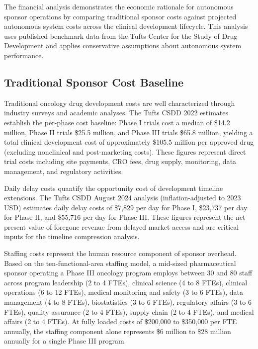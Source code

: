 
The financial analysis demonstrates the economic rationale for autonomous sponsor operations
by comparing traditional sponsor costs against projected autonomous system costs across the
clinical development lifecycle. This analysis uses published benchmark data from the Tufts
Center for the Study of Drug Development and applies conservative assumptions about
autonomous system performance.

\subsection{Traditional Sponsor Cost Baseline}

Traditional oncology drug development costs are well characterized through industry
surveys and academic analyses. The Tufts CSDD 2022 estimates \cite{tufts-csdd-cost}
establish the per-phase cost baseline: Phase I trials cost a median of \$14.2 million,
Phase II trials \$25.5 million, and Phase III trials \$65.8 million, yielding a total
clinical development cost of approximately \$105.5 million per approved drug (excluding
nonclinical and post-marketing costs). These figures represent direct trial costs
including site payments, CRO fees, drug supply, monitoring, data management, and
regulatory activities.

Daily delay costs quantify the opportunity cost of development timeline extensions.
The Tufts CSDD August 2024 analysis \cite{tufts-delay} (inflation-adjusted to 2023 USD)
estimates daily delay costs of \$7,829 per day for Phase I, \$23,737 per day for Phase II,
and \$55,716 per day for Phase III. These figures represent the net present value of
foregone revenue from delayed market access and are critical inputs for the timeline
compression analysis.

Staffing costs represent the human resource component of sponsor overhead. Based on the
ten-functional-area staffing model, a mid-sized pharmaceutical sponsor operating a Phase
III oncology program employs between 30 and 80 staff across program leadership (2 to 4
FTEs), clinical science (4 to 8 FTEs), clinical operations (6 to 12 FTEs), medical
monitoring and safety (3 to 6 FTEs), data management (4 to 8 FTEs), biostatistics (3 to 6
FTEs), regulatory affairs (3 to 6 FTEs), quality assurance (2 to 4 FTEs), supply chain
(2 to 4 FTEs), and medical affairs (2 to 4 FTEs). At fully loaded costs of \$200,000 to
\$350,000 per FTE annually, the staffing component alone represents \$6 million to \$28
million annually for a single Phase III program.

